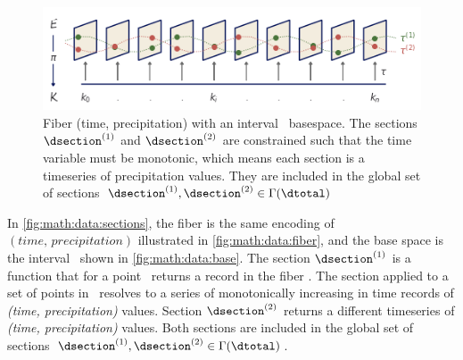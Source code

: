 \documentclass[../main.tex]{subfiles}
\begin{document}
\begin{figure}[H]
    \includegraphics[width=1\linewidth]{figures/math/fiberbundle.png}
    \caption{ Fiber (time, precipitation) with an interval \dbase\ basespace. The sections $\dsection^{(1)}$ and $\dsection^{(2)}$ are constrained such that the time variable must be monotonic, which means each section is a timeseries of precipitation values. They are included in the global set of sections  $\dsection^{(1)}, \dsection^{(2)} \in \Gamma(\dtotal)$}
    \label{fig:math:data:sections}
\end{figure}

In \autoref{fig:math:data:sections}, the fiber is the same encoding of $(time, \, precipitation)$ illustrated in \autoref{fig:math:data:fiber}, and the base space is the interval \dbase\ shown in \autoref{fig:math:data:base}. The section $\dsection^{(1)}$ is a function that for a point \dbasepoint\ returns a record in the fiber \dfiber. The section applied to a set of points in \dbase\ resolves to a series of monotonically increasing in time records of \textit{(time, precipitation)} values. Section $\dsection^{(2)}$ returns a different timeseries of \textit{(time, precipitation)} values. Both sections are included in the global set of sections $\dsection^{(1)}, \dsection^{(2)} \in \Gamma(\dtotal)$.
\end{document}
